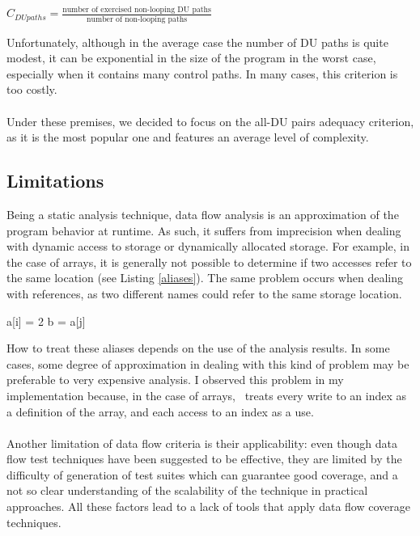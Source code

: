 \begin{center}
  $C_{DU paths} = \frac{\text{number of exercised non-looping DU paths}}
  {\text{number of non-looping paths}}$
\end{center}
%
Unfortunately, although in the average case the number of DU paths is quite 
modest, it can be exponential in the size of the program in the worst case, 
especially when it contains many control paths. In many cases, this criterion is 
too costly. 

\paragraph{}
Under these premises, we decided to focus on the all-DU pairs adequacy criterion, as it is the most popular one
and features an average level of complexity.

\subsection{Limitations}
Being a static analysis technique, data flow analysis is an approximation of 
the program behavior at runtime. As such, it suffers from imprecision when 
dealing with dynamic access to storage or dynamically allocated storage. For 
example, in the case of arrays, it is generally not possible to determine if two 
accesses refer to the same location (see Listing \ref{aliases}). The same problem occurs when dealing with 
references, as two different names could refer to the same storage location. 

\begin{center}
\begin{minipage}{0.6\textwidth}
\begin{jcode}[caption={Are these two lines a DU pair?}, label={aliases}]
a[i] = 2
b = a[j]
\end{jcode} 
\end{minipage}
\end{center}
%
How to treat these aliases depends on the use of the analysis results. In some 
cases, some degree of approximation in dealing with this kind of problem may be 
preferable to very expensive analysis. I observed this problem in my implementation because, 
in the case of arrays, \datec\ treats every write to an index as a definition of the array, and each access to an 
index as a use. 

\paragraph{}
Another limitation of data flow criteria is their applicability: even though 
data flow test techniques have been suggested to be effective, they are limited 
by the difficulty of generation of test suites which can guarantee good 
coverage, and a not so clear understanding of the scalability of the technique in 
practical approaches. All these factors lead to a lack of tools that apply data 
flow coverage techniques. %


